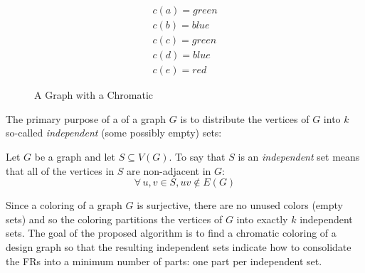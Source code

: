 \begin{figure}[h]
  \label{fig:exchromatic}
  \begin{minipage}[t]{3in}
    \begin{center}
      \vspace{0in}
    \end{center}
  \end{minipage}
  \begin{minipage}[t]{3in}
    \begin{gather*}
      c(a)=green \\
      c(b)=blue \\
      c(c)=green \\
      c(d)=blue \\
      c(e)=red
    \end{gather*}
  \end{minipage}
  \caption{A Graph with a Chromatic }
\end{figure}

The primary purpose of a  of a graph \(G\) is to distribute the vertices of \(G\) into \(k\) so-called
\emph{independent} (some possibly empty) sets:

\begin{definition}
  Let \(G\) be a graph and let \(S\subseteq V(G)\).  To say that \(S\) is an \emph{independent} set means that all of
  the vertices in \(S\) are non-adjacent in \(G\):
  \[\forall\,u,v\in S,uv\notin E(G)\]
\end{definition}

Since a  coloring of a graph \(G\) is surjective, there are no unused colors (empty sets) and so the
coloring partitions the vertices of \(G\) into exactly \(k\) independent sets.  The goal of the proposed algorithm
is to find a chromatic coloring of a design graph so that the resulting independent sets indicate how to
consolidate the FRs into a minimum number of parts: one part per independent set.

